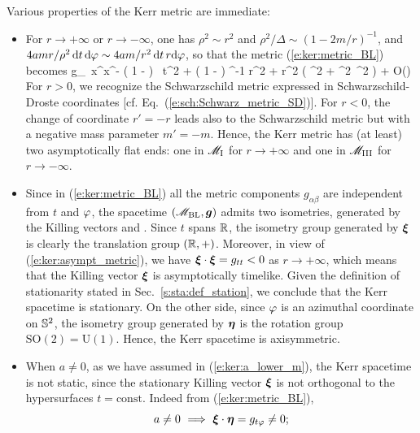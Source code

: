 Various properties of the Kerr metric are immediate:
\begin{itemize}
\item For $r\rightarrow+\infty$ or $r\rightarrow-\infty$, one has $\rho^2\sim r^2$ and
$\rho^2/\Delta \sim (1-2m/r)^{-1}$,
and $4 a m  r / \rho^2\,  \mathrm{d} t\, \mathrm{d}\varphi \sim 4 a m/r^2 \,  \mathrm{d} t\, r\mathrm{d}\varphi$,
so that the metric (\ref{e:ker:metric_BL}) becomes
\be \label{e:ker:asympt_metric}
    g_{\mu\nu}\,  \D x^\mu \D x^\nu  \simeq  - \left( 1 -  \right) \, \D t^2
    + \left( 1 -  \right) ^{-1} \D r^2
    + r^2 \left( \D \th^2 + \sin^2\th  \, \D \ph^2 \right)
    + O\left(\right)
\ee
For $r>0$, we recognize the Schwarzschild metric expressed
in Schwarzschild-Droste coordinates [cf. Eq.~(\ref{e:sch:Schwarz_metric_SD})].
For $r<0$, the change of coordinate $r'=-r$ leads also to the Schwarzschild metric
but with a negative mass parameter $m'=-m$.
Hence, the Kerr metric has (at least) two asymptotically flat ends: one in
$\mathscr{M}_{\rm I}$ for $r\rightarrow + \infty$ and one in $\mathscr{M}_{\rm III}$ for
$r\rightarrow - \infty$.
\item Since in (\ref{e:ker:metric_BL}) all the metric components $g_{\alpha\beta}$ are independent from $t$ and $\varphi$, the
spacetime $(\mathscr{M}_{\rm BL},\bm{g})$ admits two isometries, generated by the Killing
vectors
\be \label{e:ker:def_xi_eta}
     \quad\mbox{and}\quad
    \encadre{\w{\eta} := \wpar_\ph}.
\ee
Since $t$ spans $\mathbb{R}$, the isometry group generated by $\bm{\xi}$ is clearly
the translation group $(\mathbb{R},+)$. Moreover, in
view of (\ref{e:ker:asympt_metric}), we have $\bm{\xi}\cdot\bm{\xi} = g_{tt} < 0$
as $r\rightarrow +\infty$, which means that the Killing vector $\bm{\xi}$
is asymptotically timelike. Given the definition of stationarity stated in
Sec.~\ref{s:sta:def_station}, we conclude that the Kerr spacetime is
stationary.
On the other side, since $\varphi$ is an azimuthal coordinate
on $\mathbb{S}^2$, the isometry group generated by $\bm{\eta}$ is the rotation
group $\mathrm{SO}(2) = \mathrm{U}(1)$.
Hence, the Kerr spacetime is axisymmetric.
\item When $a\not=0$, as we have assumed in (\ref{e:ker:a_lower_m}), the
Kerr spacetime is not static, since the stationary Killing vector $\bm{\xi}$
is not orthogonal to the hypersurfaces $t=\mathrm{const}$. Indeed
from (\ref{e:ker:metric_BL}),
\[
    a\not=0 \ \Longrightarrow \ \bm{\xi}\cdot\bm{\eta} = g_{t\varphi} \not=0 ;
\]
\end{itemize}
